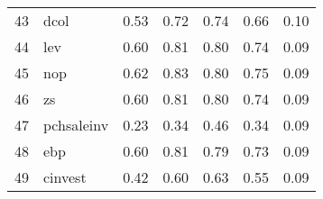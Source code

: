 \documentclass[12pt]{article}
\begin{document}
\begin{footnotesize}
\begin{longtable}{rl|c|c|c|c|c}
43  & dcol             & 0.53                                                                                      & 0.72                                                                                        & 0.74                                                                                         & 0.66 & 0.10               \\
44  & lev              & 0.60                                                                                      & 0.81                                                                                        & 0.80                                                                                         & 0.74 & 0.09               \\
45  & nop              & 0.62                                                                                      & 0.83                                                                                        & 0.80                                                                                         & 0.75 & 0.09               \\
46  & zs               & 0.60                                                                                      & 0.81                                                                                        & 0.80                                                                                         & 0.74 & 0.09               \\
47  & pchsaleinv       & 0.23                                                                                      & 0.34                                                                                        & 0.46                                                                                         & 0.34 & 0.09               \\
48  & ebp              & 0.60                                                                                      & 0.81                                                                                        & 0.79                                                                                         & 0.73 & 0.09               \\
49  & cinvest          & 0.42                                                                                      & 0.60                                                                                        & 0.63                                                                                         & 0.55 & 0.09               \\

\end{longtable}
\end{footnotesize}
\end{document}
